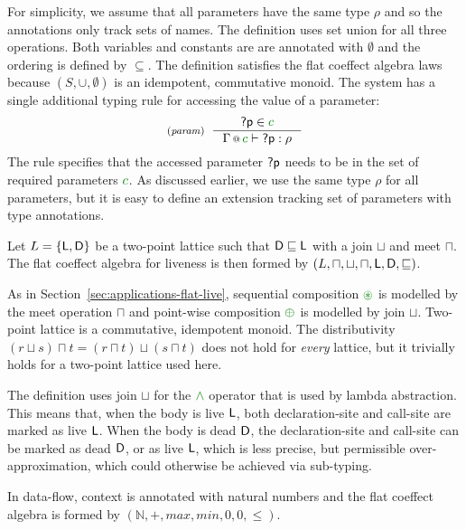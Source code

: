 \noindent
For simplicity, we assume that all parameters have the same type $\rho$ and so the annotations only
track sets of names. The definition uses set union for all three operations. Both variables and
constants are are annotated with $\emptyset$ and the ordering is defined by $\subseteq$. The 
definition satisfies the flat coeffect algebra laws because $(S, \cup, \emptyset)$ is an idempotent, 
commutative monoid. The system has a single additional typing rule for accessing the value of a
parameter:
%
\begin{equation*}
\tyrule{param}
  { \ident{?p} \in \cclrd{c} }
  { \coctx{\Gamma}{\cclrd{c}} \vdash \ident{?p} : \rho }
\end{equation*}
%
The rule specifies that the accessed parameter $\textnormal{\sffamily ?p}$ needs to be in the set of required
parameters $\cclrd{c}$. As discussed earlier, we use the same type $\rho$ for all parameters, but
it is easy to define an extension tracking set of parameters with type annotations.

\begin{example}[Liveness]
Let $L=\{ \ident{L}, \ident{D} \}$ be a two-point lattice such that $\textnormal{\sffamily D} \sqsubseteq \textnormal{\sffamily L}$
with a join $\sqcup$ and meet $\sqcap$. The flat coeffect algebra for liveness is then formed by
$(L, \sqcap, \sqcup, \sqcap, \textnormal{\sffamily L}, \textnormal{\sffamily D}, \sqsubseteq)$.
\end{example}

\noindent
As in Section~\ref{sec:applications-flat-live}, sequential composition $\cseq$ is modelled by 
the meet operation $\sqcap$ and point-wise composition $\cpar$ is modelled by join $\sqcup$. 
Two-point lattice is a commutative, idempotent monoid. The distributivity 
$(r \sqcup s) \sqcap t = (r \sqcap t) \sqcup (s \sqcap t)$ does not hold for \emph{every} 
lattice, but it trivially holds for a two-point lattice used here.

The definition uses join $\sqcup$ for the $\czip$ operator that is used by lambda abstraction.
This means that, when the body is live $\textnormal{\sffamily L}$, both declaration-site and call-site are 
marked as live $\textnormal{\sffamily L}$. When the body is dead $\textnormal{\sffamily D}$, the declaration-site and call-site
can be marked as dead $\textnormal{\sffamily D}$, or as live $\textnormal{\sffamily L}$, which is less precise, but permissible
over-approximation, which could otherwise be achieved via sub-typing.

\begin{example}
In data-flow, context is annotated with natural numbers and the flat coeffect algebra is formed 
by $(\mathbb{N}, +, \mathit{max}, \mathit{min}, 0, 0, \leq)$.
\end{example}

